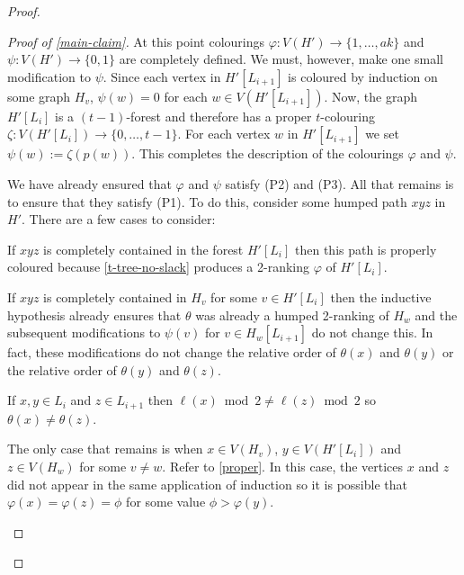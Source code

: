 \documentclass[kpfonts]{patmorin}
\theoremstyle{named}
\begin{document}
\begin{proof}
\begin{proof}[Proof of \cref{main-claim}]
       At this point colourings $\varphi:V(H')\to\{1,\ldots,ak\}$ and $\psi:V(H')\to\{0,1\}$ are completely defined.  We must, however, make one small modification to $\psi$.  Since each vertex in $H'[L_{i+1}]$ is coloured by induction on some graph $H_v$, $\psi(w)=0$ for each $w\in V(H'[L_{i+1}])$.  Now, the graph $H'[L_i]$ is a $(t-1)$-forest and therefore has a proper $t$-colouring $\zeta:V(H'[L_i])\to\{0,\ldots,t-1\}$.  For each vertex $w$ in $H'[L_{i+1}]$ we set $\psi(w):=\zeta(p(w))$.  This completes the description of the colourings $\varphi$ and $\psi$.

       We have already ensured that $\varphi$ and $\psi$ satisfy (P2) and (P3). All that remains is to ensure that they satisfy (P1).  To do this, consider some humped path $xyz$ in $H'$.  There are a few cases to consider:
       \begin{compactenum}
          \item If $xyz$ is completely contained in the forest $H'[L_i]$ then this path is properly coloured because \cref{t-tree-no-slack} produces a 2-ranking $\varphi$ of $H'[L_i]$.
          \item If $xyz$ is completely contained in $H_v$ for some $v\in H'[L_i]$ then the inductive hypothesis already ensures that $\theta$ was already a humped 2-ranking of $H_w$ and the subsequent modifications to $\psi(v)$ for $v\in H_w[L_{i+1}]$ do not change this. In fact, these modifications do not change the relative order of $\theta(x)$ and $\theta(y)$ or the relative order of $\theta(y)$ and $\theta(z)$.
          \item If $x,y\in L_i$ and $z\in L_{i+1}$ then $\ell(x)\bmod 2\neq\ell(z)\bmod 2$ so $\theta(x)\neq\theta(z)$.
          \item The only case that remains is when $x\in V(H_{v})$, $y\in V(H'[L_i])$ and $z\in V(H_w)$ for some $v\neq w$. Refer to \cref{proper}.  In this case, the vertices $x$ and $z$ did not appear in the same application of induction so it is possible that $\varphi(x)=\varphi(z)=\phi$ for some value $\phi>\varphi(y)$.


\end{compactenum}
\end{proof}
\end{proof}
\end{document}
